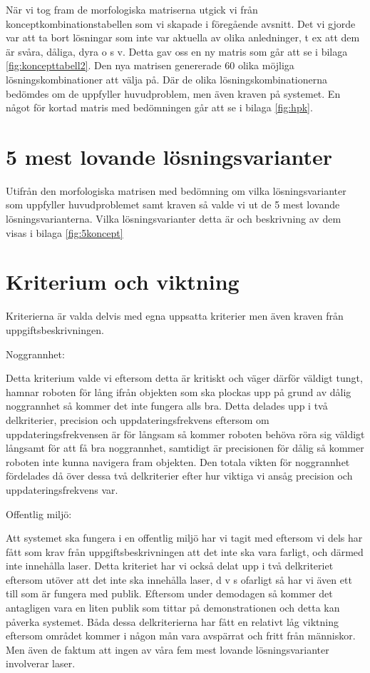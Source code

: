 \documentclass[11pt, a4paper]{report}
\begin{document}
När vi tog fram de morfologiska matriserna utgick vi från konceptkombinationstabellen som vi skapade i föregående avsnitt. Det vi gjorde var att ta bort lösningar som inte var aktuella av olika anledninger, t ex att dem är svåra, dåliga, dyra o s v. Detta gav oss en ny matris som går att se i bilaga \ref{fig:koncepttabell2}. Den nya matrisen genererade 60 olika möjliga lösningskombinationer att välja på. Där de olika lösningskombinationerna bedömdes om de uppfyller huvudproblem, men även kraven på systemet. En något för kortad matris med bedömningen går att se i bilaga \ref{fig:hpk}.

\section{5 mest lovande lösningsvarianter}

Utifrån den morfologiska matrisen med bedömning om vilka lösningsvarianter som uppfyller huvudproblemet samt kraven så valde vi ut de 5 mest lovande lösningsvarianterna. Vilka lösningsvarianter detta är och beskrivning av dem visas i bilaga \ref{fig:5koncept}


\section{Kriterium och viktning}


Kriterierna är valda delvis med egna uppsatta kriterier men även kraven från uppgiftsbeskrivningen. 

Noggrannhet:

Detta kriterium valde vi eftersom detta är kritiskt och väger därför väldigt tungt, hamnar roboten för lång ifrån objekten som ska plockas upp på grund av dålig noggrannhet så kommer det inte fungera alls bra. Detta delades upp i två delkriterier, precision och uppdateringsfrekvens eftersom om uppdateringsfrekvensen är för långsam så kommer roboten behöva röra sig väldigt långsamt för att få bra noggrannhet, samtidigt är precisionen för dålig så kommer roboten inte kunna navigera fram objekten. Den totala vikten för noggrannhet fördelades då över dessa två delkriterier efter hur viktiga vi ansåg precision och uppdateringsfrekvens var.


Offentlig miljö:

Att systemet ska fungera i en offentlig miljö har vi tagit med eftersom vi dels har fått som krav från uppgiftsbeskrivningen att det inte ska vara farligt, och därmed inte innehålla laser. Detta kriteriet har vi också delat upp i två delkriteriet eftersom utöver att det inte ska innehålla laser, d v s ofarligt så har vi även ett till som är fungera med publik. Eftersom under demodagen så kommer det antagligen vara en liten publik som tittar på demonstrationen och detta kan påverka systemet. Båda dessa delkriterierna har fått en relativt låg viktning eftersom området kommer i någon mån vara avspärrat och fritt från människor. Men även de faktum att ingen av våra fem mest lovande lösningsvarianter involverar laser.
\end{document}
